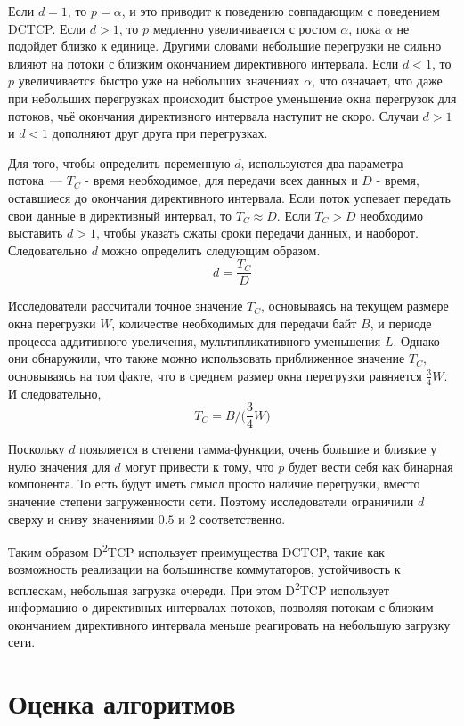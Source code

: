 \documentclass[14pt, a4paper,oneside]{extarticle}
\begin{document}
Если $d = 1$, то $p = \alpha$, и это приводит к поведению совпадающим с поведением DCTCP. Если $d > 1$, то $p$ медленно увеличивается с ростом $\alpha$, пока $\alpha$ не подойдет близко к единице. Другими словами небольшие перегрузки не сильно влияют на потоки с близким окончанием директивного интервала. Если $d < 1$, то $p$ увеличивается быстро уже на небольших значениях $\alpha$, что означает, что даже при небольших перегрузках происходит быстрое уменьшение окна перегрузок для потоков, чьё окончания директивного интервала наступит не скоро.
Случаи $d > 1$ и $d < 1$ дополняют друг друга при перегрузках.
 
Для того, чтобы определить переменную $d$, используются два параметра потока~--- $T_C$ - время необходимое, для передачи всех данных и $D$ - время, оставшиеся до окончания директивного интервала. Если поток успевает передать свои данные в директивный интервал, то $T_C \approx D$. Если $T_C > D$ необходимо выставить $d > 1$, чтобы указать сжаты сроки передачи данных, и наоборот. Следовательно $d$ можно определить следующим образом.
$$ d = \frac{T_C}{D}$$

Исследователи рассчитали точное значение $T_C$, основываясь на текущем размере окна перегрузки $W$, количестве необходимых для передачи байт $B$, и периоде процесса аддитивного увеличения, мультипликативного уменьшения $L$. Однако они обнаружили, что также можно использовать приближенное значение $T_C$, основываясь на том факте, что в среднем размер окна перегрузки равняется $\frac{3}{4}W$. И следовательно,
$$T_C = B / \big( \frac{3}{4}W \big)$$ 

Поскольку $d$ появляется в степени гамма-функции, очень большие и близкие у нулю значения для $d$ могут привести к тому, что $p$ будет вести себя как бинарная компонента. То есть будут иметь смысл просто наличие перегрузки, вместо значение степени загруженности сети. Поэтому исследователи ограничили $d$ сверху и снизу значениями $0.5$  и $2$ соответственно.

Таким образом D\textsuperscript{2}TCP использует преимущества DCTCP, такие как возможность реализации на большинстве коммутаторов, устойчивость к всплескам, небольшая загрузка очереди. При этом D\textsuperscript{2}TCP использует информацию о директивных интервалах потоков, позволяя потокам с близким окончанием директивного интервала меньше реагировать на небольшую загрузку сети.

\newpage

\section{Оценка алгоритмов}
\end{document}

